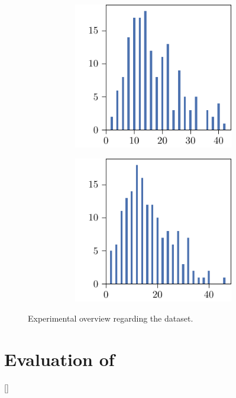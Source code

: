 \begin{figure}[p]
\begin{subfigure}{\textwidth}
\begin{subfigure}{\mymultiouter}
          \includegraphics[width=\mymultiinner]{figures/new/manhattan-princess-qlibra-retraining}
    \end{subfigure}
    \begin{subfigure}{\mymultiouter}
        \centering
          \includegraphics[width=\mymultiinner]{figures/new/manhattan-princess-permutation-retraining}
      \end{subfigure}
  \end{subfigure}
    \caption{Experimental overview regarding the \princess{} dataset.}
\end{figure}


\section{Evaluation of \qlibraname{}}[\qlibraname]

